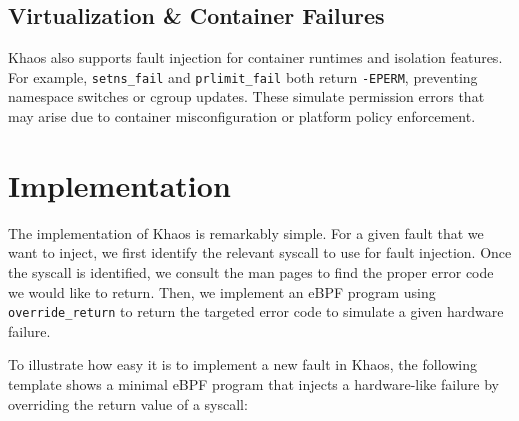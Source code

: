 \subsection{Virtualization \& Container Failures}

Khaos also supports fault injection for container runtimes and isolation features. For example, \texttt{setns\_fail} and \texttt{prlimit\_fail} both return \texttt{-EPERM}, preventing namespace switches or cgroup updates. These simulate permission errors that may arise due to container misconfiguration or platform policy enforcement.


\begin{table}[ht]
\centering
\caption{Virtualization \& Container Failures}
\label{virtualization_container_failures}
\end{table}



\section{Implementation}
The implementation of Khaos is remarkably simple. For a given fault that we want to inject, we first identify the relevant syscall to use for fault injection. Once the syscall is identified, we consult the man pages to find the proper error code we would like to return. Then, we implement an eBPF program using \texttt{override\_return} to return the targeted error code to simulate a given hardware failure.

To illustrate how easy it is to implement a new fault in Khaos, the following template shows a minimal eBPF program that injects a hardware-like failure by overriding the return value of a syscall:


